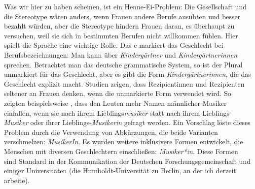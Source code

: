 Was wir hier zu haben scheinen, ist ein Henne-Ei-Problem: Die Gesellschaft und die Stereotype wären
anders, wenn Frauen andere Berufe ausübten und besser bezahlt würden, aber die Stereotype hindern
Frauen daran, es überhaupt zu versuchen, weil sie sich in bestimmten Berufen nicht willkommen fühlen.
Hier spielt die Sprache eine wichtige Rolle. Das e markiert das Geschlecht bei
Berufsbezeichnungen: Man kann über \emph{Kindergärtner} und \emph{Kindergärtnerinnen} sprechen.
Betrachtet man das deutsche grammatische System, so ist der Plural unmarkiert für das
Geschlecht, aber es gibt die Form \emph{Kindergärtnerinnen}, die das Geschlecht explizit macht.
Studien zeigen, dass Rezipientinnen und Rezipienten seltener an Frauen denken, wenn die unmarkierte
Form verwendet wird. So zeigten beispielsweise \citet{SSB2001a}, dass den Leuten mehr Namen
männlicher Musiker einfallen, wenn sie nach ihrem Lieblings\emph{musiker} statt nach ihrem
Lieblings-\emph{Musiker} oder ihrer Lieblings-\emph{Musikerin} gefragt werden. Ein Vorschlag löste
dieses Problem durch die Verwendung von Abkürzungen, die beide Varianten verschmelzen:
\emph{MusikerIn}. Es wurden weitere inklusivere Formen entwickelt, die Menschen mit diversen
Geschlechtern einschließen: \emph{Musiker*in}. Diese Formen sind Standard in der Kommunikation der
Deutschen Forschungsgemeinschaft und einiger Universitäten (\zb die Humboldt-Universität zu
Berlin, an der ich derzeit arbeite).

